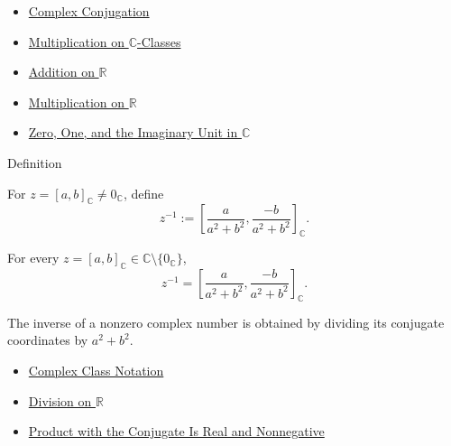\begin{dependencies}
\begin{itemize}
  \item \hyperref[def:complex-conjugation]{Complex Conjugation}
  \item \hyperref[def:multiplication-on-c-classes]{Multiplication on $\mathbb{C}$-Classes}
  \item \hyperref[def:addition-on-r]{Addition on $\mathbb{R}$}
  \item \hyperref[def:multiplication-on-r]{Multiplication on $\mathbb{R}$}
  \item \hyperref[def:zero-one-i-in-c]{Zero, One, and the Imaginary Unit in $\mathbb{C}$}
\end{itemize}
\end{dependencies}

\begin{definitionbox}{Definition}
\begin{definition}
\label{def:multiplicative-inverse-on-c}
For \(z=[a,b]_{\mathbb{C}}\ne 0_{\mathbb{C}}\), define
\[
z^{-1}
:=
\left[\frac{a}{a^2+b^2},\frac{-b}{a^2+b^2}\right]_{\mathbb{C}}.
\]
\end{definition}
\end{definitionbox}


\begin{remark*}
For every $z=[a,b]_{\mathbb{C}}\in\mathbb{C}\setminus\{0_{\mathbb{C}}\}$,
\[
z^{-1}
=
\left[\frac{a}{a^2+b^2},\frac{-b}{a^2+b^2}\right]_{\mathbb{C}}.
\]
\end{remark*}

\begin{remark*}[Interpretation]
The inverse of a nonzero complex number is obtained by dividing its conjugate
coordinates by $a^2+b^2$.
\end{remark*}

\begin{dependencies}
\begin{itemize}
  \item \hyperref[def:complex-class-notation]{Complex Class Notation}
  \item \hyperref[def:division-on-r]{Division on $\mathbb{R}$}
  \item \hyperref[lem:complex-product-with-conjugate]{Product with the Conjugate Is Real and Nonnegative}
\end{itemize}
\end{dependencies}

